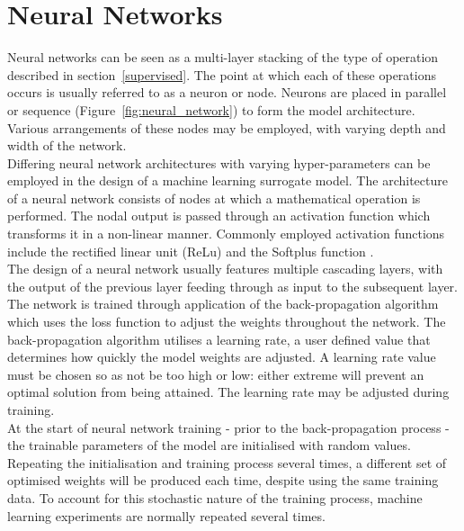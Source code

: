 \section{Neural Networks} \label{NN}

Neural networks can be seen as a multi-layer stacking of the type of operation described in section~\ref{supervised}. The point at which each of these operations occurs is usually referred to as a neuron or node. Neurons are placed in parallel or sequence (Figure~\ref{fig:neural_network}) to form the model architecture.  Various arrangements of these nodes may be employed, with varying depth and width of the network. 
\\

\noindent
Differing neural network architectures with varying hyper-parameters \cite{gurney1997introduction} can be employed in the design of a machine learning surrogate model. The architecture of a neural network consists of nodes at which a mathematical operation is performed. The nodal output is passed through an activation function which transforms it in a non-linear manner. Commonly employed activation functions include the rectified linear unit (ReLu) \cite{hara2015analysis} and the Softplus function \cite{zheng2015improving}. 
\\

\noindent
The design of a neural network usually features multiple cascading layers, with the output of the previous layer feeding through as input to the subsequent layer. The network is trained through application of the back-propagation algorithm \cite{hecht1992theory} which uses the loss function to adjust the weights throughout the network. The back-propagation algorithm utilises a learning rate, a user defined value that determines how quickly the model weights are adjusted. A learning rate value must be chosen so as not be too high or low: either extreme will prevent an optimal solution from being attained. The learning rate may be adjusted during training. 
\\

\noindent
At the start of neural network training - prior to the back-propagation process - the trainable parameters of the model are initialised with random values. Repeating the initialisation and training process several times, a different set of optimised weights will be produced each time, despite using the same training data. To account for this stochastic nature of the training process, machine learning experiments are normally repeated several times.
\\

